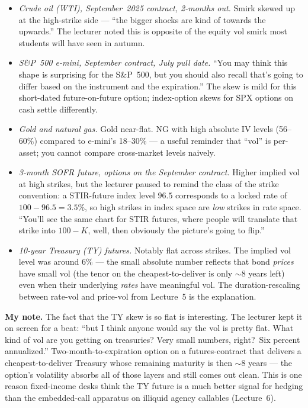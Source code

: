 \begin{itemize}
  \item \emph{Crude oil (WTI), September~2025 contract, 2-months out.}
        Smirk skewed up at the high-strike side --- ``the bigger
        shocks are kind of towards the upwards.'' The lecturer noted
        this is opposite of the equity vol smirk most students will
        have seen in autumn.
  \item \emph{S\&P~500 e-mini, September contract, July pull date.}
        ``You may think this shape is surprising for the S\&P~500,
        but you should also recall that's going to differ based on the
        instrument and the expiration.'' The skew is mild for this
        short-dated future-on-future option; index-option skews for
        SPX options on cash settle differently.
  \item \emph{Gold and natural gas.} Gold near-flat. NG with high
        absolute IV levels (56--60\%) compared to e-mini's 18--30\%
        --- a useful reminder that ``vol'' is per-asset; you cannot
        compare cross-market levels naively.
  \item \emph{3-month SOFR future, options on the September contract.}
        Higher implied vol at high strikes, but the lecturer paused
        to remind the class of the strike convention: a STIR-future
        index level $96.5$ corresponds to a locked rate of
        $100 - 96.5 = 3.5\%$, so high strikes in index space are
        \emph{low} strikes in rate space. ``You'll see the same chart
        for STIR futures, where people will translate that strike into
        $100 - K$, well, then obviously the picture's going to flip.''
  \item \emph{10-year Treasury (TY) futures.} Notably flat across
        strikes. The implied vol level was around 6\% --- the small
        absolute number reflects that bond \emph{prices} have small
        vol (the tenor on the cheapest-to-deliver is only $\sim 8$
        years left) even when their underlying \emph{rates} have
        meaningful vol. The duration-rescaling between rate-vol and
        price-vol from Lecture~5 is the explanation.
\end{itemize}

\begin{checkpoint}
\textbf{My note.} The fact that the TY skew is so flat is interesting.
The lecturer kept it on screen for a beat: ``but I think anyone would
say the vol is pretty flat. What kind of vol are you getting on
treasuries? Very small numbers, right?\ Six percent annualized.''
Two-month-to-expiration option on a futures-contract that delivers a
cheapest-to-deliver Treasury whose remaining maturity is then
$\sim 8$ years --- the option's volatility absorbs all of those layers
and still comes out clean. This is one reason fixed-income desks
think the TY future is a much better signal for hedging than the
embedded-call apparatus on illiquid agency callables (Lecture~6).
\end{checkpoint}

